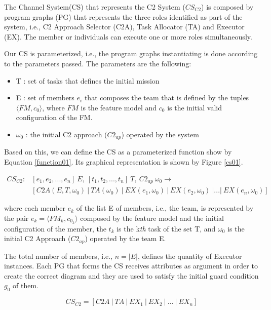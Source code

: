 The Channel System(CS) that represents the C2 System ($CS_{C2}$) is composed by program graphs (PG) that represents the three roles identified as part of the system, i.e., C2 Approach Selector (C2A), Task Allocator (TA) and Executor (EX). The member or individuals can execute one or more roles simultaneously.

Our CS is parameterized, i.e., the program graphs instantiating is done according to the parameters passed. The parameters are the following:
\begin{itemize}
    \item T : set of tasks that defines the initial mission
    \item E : set of members $e_i$ that composes the team that is defined by the tuples $\langle FM, c_0\rangle$, where $FM$ is the feature model and $c_0$ is the initial valid configuration of the FM. 
    \item $\omega_0$ : the initial C2 approach ($C2_{ap}$) operated by the system
\end{itemize}

Based on this, we can define the CS as a parameterized function show by Equation \ref{function01}. Its graphical representation is shown by Figure \ref{cs01}.

\begin{equation}
\label{function01}
\begin{aligned}
CS_{C2}:&[e_1, e_2, ..., e_n]\ E,\ [t_1, t_2, ..., t_n]\ T,\ C2_{ap}\ \omega_0 \longrightarrow \\
&[C2A(E,T,\omega_0)\ |\ TA(\omega_0)\ |\ EX(e_1, \omega_0)\ |\ EX(e_2, \omega_0)\ |...|\ EX(e_n, \omega_0)]
\end{aligned}
\end{equation}

where each member $e_k$ of the list E of members, i.e., the team, is represented by the pair $e_k=\langle FM_k,c_{0_k} \rangle$ composed by the feature model and the initial configuration of the member, the $t_k$ is the k\textit{th} task of the set T, and $\omega_0$ is the initial C2 Approach ($C2_{ap}$) operated by the team E.

The total number of members, i.e., $n=|E|$, defines the quantity of Executor instances. Each PG that forms the CS receives attributes as argument in order to create the correct diagram and they are used to satisfy the initial guard condition $g_0$ of them.

\begin{equation}
\label{CS01}
    CS_{C2} = [C2A\ |\ TA\ |\ EX_1\ |\ EX_2\ |\ ...\ |\ EX_n]
\end{equation}

